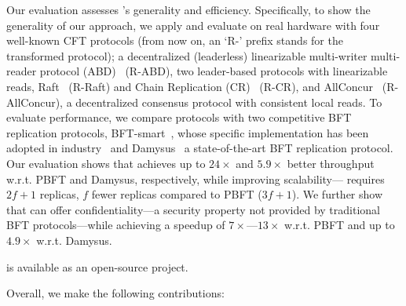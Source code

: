 Our evaluation assesses \projecttitle{}'s generality and efficiency. Specifically, to show the generality of our approach, we apply and evaluate \projecttitle{} on real hardware with four well-known CFT protocols (from now on, an `R-' prefix stands for the transformed protocol); a decentralized (leaderless) linearizable multi-writer multi-reader protocol (ABD)~\cite{lynch:1997} (R-ABD), two leader-based protocols with linearizable reads, Raft~\cite{raft} (R-Raft) and Chain Replication (CR)~\cite{chain-replication} (R-CR), and AllConcur~\cite{Poke2016AllConcurLC} (R-AllConcur), a decentralized consensus protocol with consistent local reads. To evaluate performance, we compare \projecttitle{} protocols with two competitive BFT replication protocols, BFT-smart~\cite{bft-smart}, whose specific implementation has been adopted in industry~\cite{bftsmarthyperledger} and Damysus~\cite{10.1145/3492321.3519568} a state-of-the-art BFT replication protocol.  Our evaluation shows that \projecttitle{} achieves up to $24\times$ and $5.9\times$ better throughput w.r.t. PBFT and Damysus, respectively, while improving scalability---\projecttitle{} requires $2f+1$ replicas, $f$ fewer replicas compared to PBFT ($3f+1$). We further show that \projecttitle{} can offer confidentiality---a security property not provided by traditional BFT protocols---while achieving a speedup of $7\times$---$13\times$ w.r.t. PBFT and up to $4.9\times$ w.r.t. Damysus.

 \projecttitle{} is available as an open-source project.%



 Overall, we make the following contributions:


